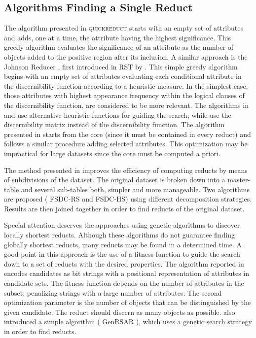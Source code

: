 \documentclass[authoryear,11pt]{elsarticle}
\makeatletter
\newcommand{\setword}[2]{%
  \phantomsection
  #1\def\@currentlabel{\unexpanded{#1}}\label{#2}%
}
\makeatother
\begin{document}
\subsection{Algorithms Finding a Single Reduct}
  The algorithm presented in \citep{Chouchoulas01} \setword{\textsc{quickreduct}}{quickreduct} starts with 
  an empty set of attributes and adds, one at a time, the attribute having the highest significance. 
  This greedy algorithm evaluates the significance of an attribute as the number of objects added to 
  the positive region after its inclusion.  
  A similar approach is the Johnson Reducer \citep{Johnson74}, first introduced in RST by \cite{Ohrn00}.
  This simple greedy algorithm begins with an empty set of attributes evaluating each conditional attribute in the
  discernibility function according to a heuristic measure. In the simplest case, those attributes with highest 
  appearance frequency within the logical clauses of the discernibility function, are considered to be more
  relevant. The algorithms in \citep{Nguyen97} and \citep{Wang01} use alternative heuristic functions for guiding 
  the search; while \citep{Yang08} use the discernibility matrix instead of the discernibility 
  function.
  The algorithm presented in \citep{Zhong01} starts from the core (since it must be contained in every reduct) and
  follows a similar procedure adding selected attributes. This optimization may be impractical for large datasets
  \citep{Jensen14} since the core must be computed a priori.
  
  The method presented in \citep{Jiao10} improves the efficiency of computing reducts by means of subdivisions 
  of the dataset. The original dataset is broken down into a master-table and several sub-tables both, simpler
  and more manageable. Two algorithms are proposed (\setword{FSDC-RS}{FSDCRS} and FSDC-HS) using 
  different decomposition strategies. Results are then joined together in order to find reducts of the original 
  dataset. 
    
  Special attention deserves the approaches using genetic algorithms to discover locally shortest reducts. Although 
  these algorithms do not guarantee finding globally shortest reducts, many reducts may be found in a determined
  time. A good point in this approach is the use of a fitness function to guide the search down to a set of 
  reducts with the desired properties. The algorithm reported in \citep{Wroblewski95} encodes candidates as bit 
  strings with a positional representation of attributes in candidate sets. The fitness function
  depends on the number of attributes in the subset, penalizing strings with a large number of attributes. The 
  second optimization parameter is the number of objects that can be distinguished by the given candidate. The 
  reduct should discern as many objects as possible. \cite{Jensen03} also introduced a simple algorithm 
  (\setword{GenRSAR}{GenRSAR}), which uses a genetic search strategy in order to find reducts.
  
\end{document}

